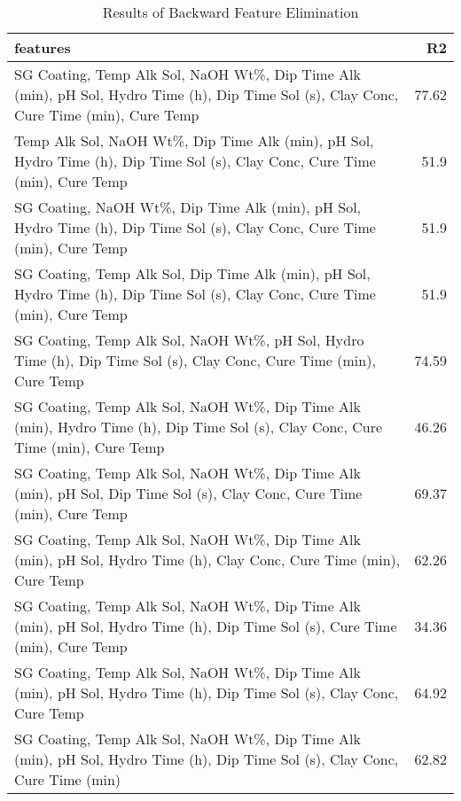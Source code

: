 
    \begin{table*}[h]
        \centering
        \begin{tabular}{lr}
\hline
 features                                                                                                                                 &    R2 \\
\hline
 SG Coating, Temp Alk Sol, NaOH Wt\%, Dip Time Alk (min), pH Sol, Hydro Time (h), Dip Time Sol (s), Clay Conc, Cure Time (min), Cure Temp & 77.62 \\
 Temp Alk Sol, NaOH Wt\%, Dip Time Alk (min), pH Sol, Hydro Time (h), Dip Time Sol (s), Clay Conc, Cure Time (min), Cure Temp             & 51.9  \\
 SG Coating, NaOH Wt\%, Dip Time Alk (min), pH Sol, Hydro Time (h), Dip Time Sol (s), Clay Conc, Cure Time (min), Cure Temp               & 51.9  \\
 SG Coating, Temp Alk Sol, Dip Time Alk (min), pH Sol, Hydro Time (h), Dip Time Sol (s), Clay Conc, Cure Time (min), Cure Temp            & 51.9  \\
 SG Coating, Temp Alk Sol, NaOH Wt\%, pH Sol, Hydro Time (h), Dip Time Sol (s), Clay Conc, Cure Time (min), Cure Temp                     & 74.59 \\
 SG Coating, Temp Alk Sol, NaOH Wt\%, Dip Time Alk (min), Hydro Time (h), Dip Time Sol (s), Clay Conc, Cure Time (min), Cure Temp         & 46.26 \\
 SG Coating, Temp Alk Sol, NaOH Wt\%, Dip Time Alk (min), pH Sol, Dip Time Sol (s), Clay Conc, Cure Time (min), Cure Temp                 & 69.37 \\
 SG Coating, Temp Alk Sol, NaOH Wt\%, Dip Time Alk (min), pH Sol, Hydro Time (h), Clay Conc, Cure Time (min), Cure Temp                   & 62.26 \\
 SG Coating, Temp Alk Sol, NaOH Wt\%, Dip Time Alk (min), pH Sol, Hydro Time (h), Dip Time Sol (s), Cure Time (min), Cure Temp            & 34.36 \\
 SG Coating, Temp Alk Sol, NaOH Wt\%, Dip Time Alk (min), pH Sol, Hydro Time (h), Dip Time Sol (s), Clay Conc, Cure Temp                  & 64.92 \\
 SG Coating, Temp Alk Sol, NaOH Wt\%, Dip Time Alk (min), pH Sol, Hydro Time (h), Dip Time Sol (s), Clay Conc, Cure Time (min)            & 62.82 \\
\hline
\end{tabular}
        \caption{Results of Backward Feature Elimination}
        \label{backward}
    \end{table*}
    

